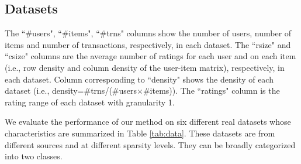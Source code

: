 \documentclass[letterpaper]{article}
\begin{document}
\subsection{Datasets}
\begin{table}[ht]
\caption{The datasets used in evaluation}
\label{tab:data}
\begin{center}
\tiny
   \begin{tablenotes}
      \tiny
      \item The ``\#users", ``\#items", ``\#trns" columns show the number of users, number of items and number of transactions, respectively, in each dataset. The ``rsize" and ``csize" columns are the average number of ratings for each user and on each item (i.e., row density and column density of the user-item matrix), respectively, in each dataset. Column corresponding to ``density" shows the density of each dataset (i.e., density=\#trns/(\#users$\times$\#items)). The ``ratings" column is the rating range of each dataset with granularity 1.
    \end{tablenotes}
\end{center}
\end{table}
We evaluate the performance of our method on six different real datasets whose characteristics are summarized in Table \ref{tab:data}. These datasets are from different sources and at different sparsity levels. They can be broadly categorized into two classes.
\end{document}
